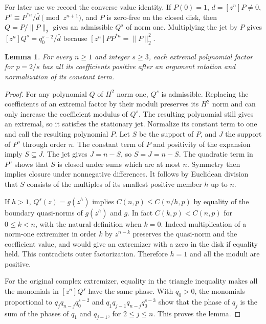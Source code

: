 \documentclass[11pt]{article}
\newtheorem{lemma}[theorem]{Lemma}
\begin{document}
For later use we record the converse value identity. If \(P(0)=1\),
\(d=[z^n]P\ne0\), \(P^a\equiv P^{*n}/\bar d\pmod{z^{n+1}}\), and
\(P\) is zero-free on the closed disk, then \(Q=P/\|P\|_2\) gives an
admissible \(Q^s\) of norm one. Multiplying the jet by \(P\) gives
\([z^n]Q^s=q_0^{s-2}/\bar d\) because
\([z^n]PP^{*n}=\|P\|_2^2\).

\begin{lemma}\label{lem:positive-integer}
For every \(n\geq1\) and integer \(s\geq3\), each extremal
polynomial factor for \(p=2/s\) has all its coefficients positive
after an argument rotation and normalization of its constant term.
\end{lemma}

\begin{proof}
For any polynomial \(Q\) of \(H^2\) norm one, \(Q^s\) is
admissible. Replacing the coefficients of an extremal factor by
their moduli preserves its \(H^2\) norm and can only increase the
coefficient modulus of \(Q^s\). The resulting polynomial still
gives an extremal, so it satisfies the stationary jet. Normalize
its constant term to one and call the resulting polynomial \(P\).
Let \(S\) be the support of \(P\), and \(J\) the support of \(P^a\)
through order \(n\). The constant term of \(P\) and positivity of
the expansion imply \(S\subseteq J\). The jet gives \(J=n-S\),
so \(S=J=n-S\). The quadratic term in \(P^a\) shows that \(S\)
is closed under sums which are at most \(n\). Symmetry then
implies closure under nonnegative differences. It follows by
Euclidean division that \(S\) consists of the multiples of its
smallest positive member \(h\) up to \(n\).

If \(h>1\), \(Q^s(z)=g(z^h)\) implies \(C(n,p)\leq C(n/h,p)\)
by equality of the boundary quasi-norms of \(g(z^h)\) and \(g\).
In fact \(C(k,p)<C(n,p)\) for \(0\leq k<n\), with the natural
definition when \(k=0\). Indeed multiplication of a norm-one
extremizer in order \(k\) by \(z^{n-k}\) preserves the quasi-norm
and the coefficient value, and would give an extremizer with a
zero in the disk if equality held. This contradicts outer
factorization. Therefore \(h=1\) and all the moduli are positive.

For the original complex extremizer, equality in the triangle
inequality makes all the monomials in \([z^n]Q^s\) have the same
phase. With \(q_0>0\), the monomials proportional to
\(q_jq_{n-j}q_0^{s-2}\) and
\(q_1q_{j-1}q_{n-j}q_0^{s-3}\) show that the phase of \(q_j\)
is the sum of the phases of \(q_1\) and \(q_{j-1}\), for
\(2\leq j\leq n\). This proves the lemma.
\end{proof}
\end{document}
